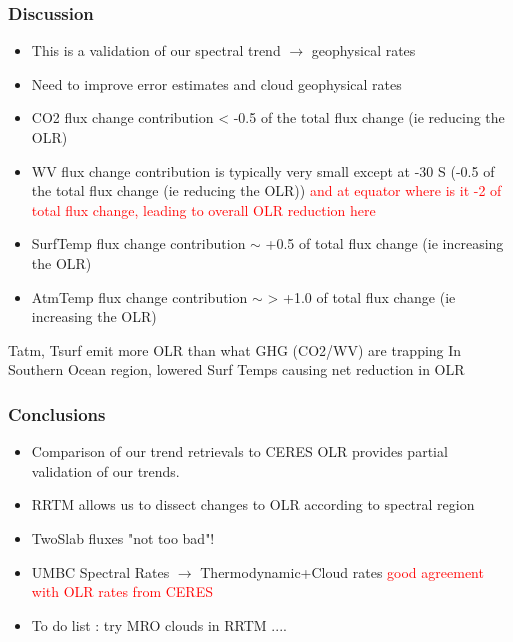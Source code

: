 \documentclass[10pt,t]{beamer}
\begin{document}
\begin{frame}
  \frametitle{Discussion}
  \begin{itemize}
    \item This is a validation of our spectral trend $\rightarrow$ geophysical rates
    \item Need to improve error estimates and cloud geophysical rates
    \item CO2 flux change contribution < -0.5 of the total flux change (ie reducing the OLR)
    \item WV  flux change contribution is typically very small except at -30 S (-0.5 of the total flux change (ie reducing the OLR))
          \textcolor{red}{and at equator where is it -2 of total flux change, leading to overall OLR reduction here}
    \item SurfTemp flux change contribution $\sim$ +0.5 of total flux change (ie increasing the OLR)
    \item AtmTemp  flux change contribution $\sim$ > +1.0 of total flux change (ie increasing the OLR)            
  \end{itemize}
  Tatm, Tsurf emit more OLR than what GHG (CO2/WV) are trapping \newline
  In Southern Ocean region, lowered Surf Temps causing net reduction in OLR
  \end{frame}

\begin{frame}
  \frametitle{Conclusions}
  \begin{itemize}
  \item Comparison of our trend retrievals to CERES OLR provides partial validation of our trends.
  \item RRTM allows us to dissect changes to OLR according to spectral region
    \item TwoSlab fluxes "not too bad"!
  \item UMBC Spectral Rates $\rightarrow$ Thermodynamic+Cloud rates \textcolor{red}{good agreement
        with OLR rates from CERES}
  \item To do list : try MRO clouds in RRTM ....
  \end{itemize}
\end{frame}
\end{document}
